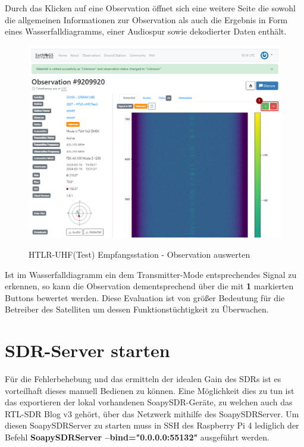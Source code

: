 Durch das Klicken auf eine Observation öffnet sich eine weitere Seite die sowohl die allgemeinen Informationen zur Observation als auch die Ergebnis in Form eines Wasserfalldiagramms, einer Audiospur sowie dekodierter Daten enthält. 

\begin{figure} [H]
	\centering
	\includegraphics[width=\linewidth]{../ref/vet_observation.png}
	\caption{HTLR-UHF(Test) Empfangsstation - Observation auswerten} \cite{noauthor_satnogs_nodate}
	\label{fig:htrl-uhf(test)vetobservation}
\end{figure}

Ist im Wasserfalldiagramm ein dem Transmitter-Mode entsprechendes Signal zu erkennen, so kann die Observation dementsprechend über die mit \textbf{1} markierten Buttons bewertet werden. Diese Evaluation ist von größer Bedeutung für die Betreiber des Satelliten um dessen Funktionstüchtigkeit zu Überwachen.

\section{SDR-Server starten}
Für die Fehlerbehebung und das ermitteln der idealen Gain des SDRs ist es vorteilhaft dieses manuell Bedienen zu können. Eine Möglichkeit dies zu tun ist das exportieren der lokal vorhandenen SoapySDR-Geräte, zu welchen auch das RTL-SDR Blog v3 gehört, über das Netzwerk mithilfe des SoapySDRServer. Um diesen SoapySDRServer zu starten muss in SSH des Raspberry Pi 4 lediglich der Befehl \textbf{SoapySDRServer --bind="0.0.0.0:55132"} ausgeführt werden. \cite{noauthor_soapysdrserver1_nodate}

